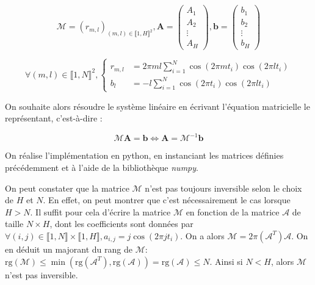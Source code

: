 \documentclass[12pt]{report}
\begin{document}
\begin{equation}
    \mathcal{M} = (r_{m,l})_{(m,l)\in \llbracket 1, H\rrbracket ^2}, 
    \bm{A} = \begin{pmatrix}
                A_1 \\
                A_2 \\
                \vdots \\
                A_H
              \end{pmatrix}, 
    \bm{b} = \begin{pmatrix}
                b_1 \\
                b_2 \\
                \vdots \\
                b_H
              \end{pmatrix}
\label{eq:définition notation}
\end{equation}

\begin{equation}
\forall (m,l) \in \llbracket 1, N\rrbracket ^2,
\left\{
    \begin{aligned}
        r_{m,l} &= 2\pi ml \sum_{i=1}^{N}\cos(2\pi mt_i)\cos(2\pi lt_i) \\
        b_l &= -l\sum_{i=1}^{N}\cos(2\pi t_i)\cos(2\pi lt_i)
    \end{aligned}
\right.
\label{eq:définition coefficients}
\end{equation}

On souhaite alors résoudre le système linéaire en écrivant l'équation matricielle le représentant, c'est-à-dire :

\begin{equation}
    \mathcal{M} \bm{A} = \bm{b} \Leftrightarrow \bm{A} = \mathcal{M}^{-1}\bm{b}
\label{eq:équation matricielle}
\end{equation}

On réalise l'implémentation en python, en instanciant les matrices définies précédemment et à l'aide de la bibliothèque \emph{numpy}. 

On peut constater que la matrice $\mathcal{M}$ n'est pas toujours inversible selon le choix de $H$ et $N$. 
En effet, on peut montrer que c'est nécessairement le cas lorsque $H>N$. Il suffit pour cela d'écrire la matrice $\mathcal{M}$ en fonction de la matrice $\mathcal{A}$ de taille $N \times H$, dont les coefficients sont données par $ \forall (i,j) \in \llbracket 1, N\rrbracket \times \llbracket 1, H\rrbracket, a_{i,j} = j \cos(2 \pi j t_i)$.
On a alors $\mathcal{M} = 2\pi(\mathcal{A}^T)\mathcal{A}$. On en déduit un majorant du rang de $\mathcal{M}$: $\mathrm{rg}(\mathcal{M}) \leq \min(\mathrm{rg}(\mathcal{A}^T), \mathrm{rg}(\mathcal{A})) = \mathrm{rg}(\mathcal{A}) \leq N $. Ainsi si $N<H$, alors $\mathcal{M}$ n'est pas inversible.
\end{document}

